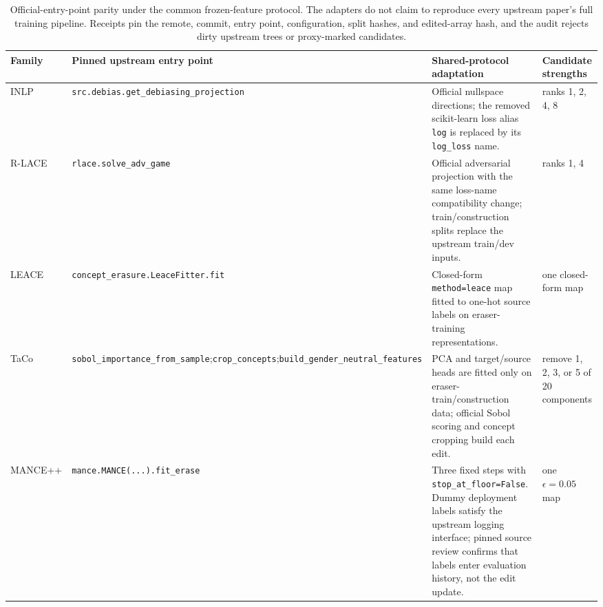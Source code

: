 \begin{table}[t]
\centering
\footnotesize
\begin{tabular}{@{}p{}p{}p{}p{}@{}}
\toprule
Family & Pinned upstream entry point & Shared-protocol adaptation & Candidate strengths \\
\midrule
INLP & \texttt{src.debias.}\newline\texttt{get\_debiasing\_}\newline\texttt{projection} & Official nullspace directions; the removed scikit-learn loss alias \texttt{log} is replaced by its \texttt{log\_loss} name. & ranks 1, 2, 4, 8 \\
R-LACE & \texttt{rlace.}\newline\texttt{solve\_adv\_game} & Official adversarial projection with the same loss-name compatibility change; train/construction splits replace the upstream train/dev inputs. & ranks 1, 4 \\
LEACE & \texttt{concept\_erasure.}\newline\texttt{LeaceFitter.fit} & Closed-form \texttt{method=leace} map fitted to one-hot source labels on eraser-training representations. & one closed-form map \\
TaCo & \texttt{sobol\_importance\_}\newline\texttt{from\_sample};\newline\texttt{crop\_concepts};\newline\texttt{build\_gender\_neutral\_}\newline\texttt{features} & PCA and target/source heads are fitted only on eraser-train/construction data; official Sobol scoring and concept cropping build each edit. & remove 1, 2, 3, or 5 of 20 components \\
MANCE++ & \texttt{mance.MANCE(...)}\newline\texttt{.fit\_erase} & Three fixed steps with \texttt{stop\_at\_floor=False}. Dummy deployment labels satisfy the upstream logging interface; pinned source review confirms that labels enter evaluation history, not the edit update. & one $\epsilon=0.05$ map \\
\bottomrule
\end{tabular}
\caption{Official-entry-point parity under the common frozen-feature protocol.
The adapters do not claim to reproduce every upstream paper's full training
pipeline. Receipts pin the remote, commit, entry point, configuration, split
hashes, and edited-array hash, and the audit rejects dirty upstream trees or
proxy-marked candidates.}
\label{tab:official-adapters}
\end{table}

